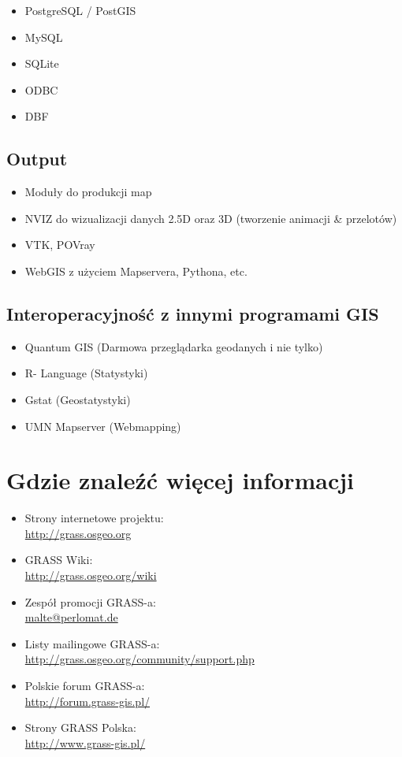 \documentclass[notumble,a4paper,10pt,nofoldmark]{leaflet}
\newcommand{\GRASSurl}{\url{http://grass.osgeo.org}}
\begin{document}
\begin{itemize}
\item PostgreSQL / PostGIS
\item MySQL
\item SQLite
\item ODBC
\item DBF
\end{itemize}

\subsection{Output}

\begin{itemize}
\item Moduły do produkcji map
\item NVIZ do wizualizacji danych 2.5D oraz 3D (tworzenie animacji \& przelotów)
\item VTK, POVray
\item WebGIS z użyciem Mapservera, Pythona, etc.
\end{itemize}

\subsection{Interoperacyjność z innymi programami GIS}

\begin{itemize}
\item Quantum GIS (Darmowa przeglądarka geodanych i nie tylko)
\item R- Language (Statystyki)
\item Gstat (Geostatystyki)
\item UMN Mapserver (Webmapping)
\end{itemize}

\section{Gdzie znaleźć więcej informacji}

\begin{itemize}
\item{Strony internetowe projektu: \\\GRASSurl}
\item{GRASS Wiki: \\\url{http://grass.osgeo.org/wiki}}
\item{Zespół promocji GRASS-a: \\\url{malte@perlomat.de}}
\item{Listy mailingowe GRASS-a: \\\url{http://grass.osgeo.org/community/support.php}}
\item{Polskie forum GRASS-a: \\\url{http://forum.grass-gis.pl/}}
\item{Strony GRASS Polska: \\\url{http://www.grass-gis.pl/}}
\end{itemize}
\end{document}
